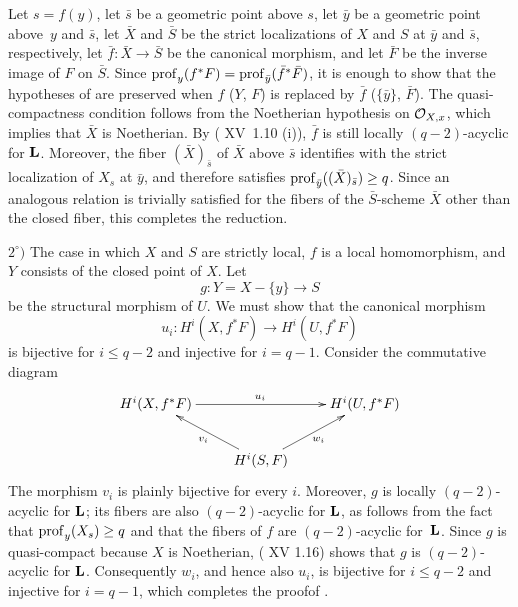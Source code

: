 Let $s=f(y)$, let $\bar s$ be a geometric point above $s$, let $\bar y$ be a geometric point above~$y$ and $\bar s$, let $\bar X$ and $\bar S$ be the strict localizations of $X$ and $S$ at $\bar y$ and $\bar s$, respectively, let $\bar f:\bar X\to\bar S$ be the canonical morphism, and let $\bar F$ be the inverse image of $F$ on $\bar S$. Since $\operatorname{prof}_y(f^*F)=\operatorname{prof}_{\bar y}(\bar f^*\bar F)$, it is enough to show that the hypotheses of  are preserved when $f$ (\resp $Y$, \resp $F$) is replaced by $\bar f$ (\resp $\{\bar y\}$, \resp $\bar F$). The quasi-compactness condition follows from the Noetherian hypothesis on $\mathcal O_{X,x}$, which implies that $\bar X$ is Noetherian\pageoriginale. By ( XV~1.10 \textup{(i)}), $\bar f$ is still locally $(q-2)$-acyclic for $\mathbf L$. Moreover, the fiber $(\bar X)_{\bar s}$ of $\bar X$ above $\bar s$ identifies with the strict localization of $X_s$ at $\bar y$, and therefore satisfies $\operatorname{prof}_{\bar y}((\bar X)_{\bar s})\geq q$. Since an analogous relation is trivially satisfied for the fibers of the $\bar S$-scheme $\bar X$ other than the closed fiber, this completes the reduction.

$2^\circ)$ The case in which $X$ and $S$ are strictly local, $f$ is a local homomorphism, and $Y$ consists of the closed point of $X$. Let
$$g:Y=X-\{y\}\to S$$
be the structural morphism of $U$. We must show that the canonical morphism
$$u_i:H^i(X, f^*F)\to H^i(U, f^*F)$$
is bijective for $i\leq q-2$ and injective for $i=q-1$. Consider the commutative diagram
$$
\xymatrix{H^i(X, f^*F)\ar[rr]^{u_i}&& H^i(U, f^*F)\\&H^i(S, F)\ar[lu]^{v_i}\ar[ru]_{w_i}}$$
The morphism $v_i$ is plainly bijective for every $i$. Moreover, $g$ is locally $(q-2)$-acyclic for $\mathbf L$; its fibers are also $(q-2)$-acyclic for $\mathbf L$, as follows from the fact that $\operatorname{prof}_y(X_s)\geq q$ and that the fibers of $f$ are $(q-2)$-acyclic for~$\mathbf L$. Since $g$ is quasi-compact because $X$ is Noetherian, ( XV 1.16) shows that $g$ is $(q-2)$-acyclic for $\mathbf L$. Consequently $w_i$, and hence also $u_i$, is bijective for $i\leq q-2$ and injective for $i=q-1$, which completes the proof\pageoriginale of .

